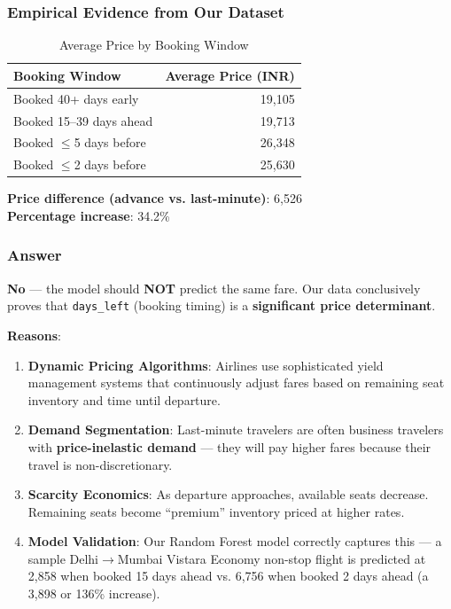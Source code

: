 \documentclass[12pt, a4paper]{article}
\newcommand{\rupee}{\text{₹}}
\begin{document}
\subsubsection{Empirical Evidence from Our Dataset}

\begin{table}[H]
\centering
\caption{Average Price by Booking Window}
\begin{tabular}{l r}
\toprule
\textbf{Booking Window} & \textbf{Average Price (INR)} \\
\midrule
Booked 40+ days early    & \rupee19,105 \\
Booked 15--39 days ahead & \rupee19,713 \\
Booked $\leq$5 days before  & \rupee26,348 \\
Booked $\leq$2 days before  & \rupee25,630 \\
\bottomrule
\end{tabular}
\end{table}

\textbf{Price difference (advance vs. last-minute)}: \rupee6,526 \\
\textbf{Percentage increase}: 34.2\%

\subsubsection{Answer}

\begin{insightbox}
\textbf{No} — the model should \textbf{NOT} predict the same fare. Our data conclusively proves that \texttt{days\_left} (booking timing) is a \textbf{significant price determinant}.

\textbf{Reasons}:
\begin{enumerate}
    \item \textbf{Dynamic Pricing Algorithms}: Airlines use sophisticated yield management systems that continuously adjust fares based on remaining seat inventory and time until departure.
    
    \item \textbf{Demand Segmentation}: Last-minute travelers are often business travelers with \textbf{price-inelastic demand} — they will pay higher fares because their travel is non-discretionary.
    
    \item \textbf{Scarcity Economics}: As departure approaches, available seats decrease. Remaining seats become ``premium'' inventory priced at higher rates.
    
    \item \textbf{Model Validation}: Our Random Forest model correctly captures this — a sample Delhi$\rightarrow$Mumbai Vistara Economy non-stop flight is predicted at \rupee2,858 when booked 15 days ahead vs. \rupee6,756 when booked 2 days ahead (a \rupee3,898 or 136\% increase).
\end{enumerate}
\end{insightbox}
\end{document}

